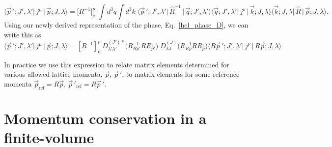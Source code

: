 \documentclass[twocolumn,amsmath,amssymb,prd,10pt,floatfix, 
superscriptaddress,nofootinbib, showpacs, preprintnumbers]{revtex4-1}
\begin{document}
\begin{widetext}
	\begin{equation}
		\big\langle \vec{p}\,'; J' ,\lambda'  \big| \, j^\mu\,  \big| \, \vec{p}; J, \lambda  \big\rangle = 
		\big[ R^{-1} \big]^\mu_\nu\; \int\!\!  d^3 q \int\!\!  d^3 k  \; 		
		\big\langle \vec{p}\,'; J',\lambda' \big| \, \hat{R}^{-1} \, \big|\, \vec{q}; J', \lambda' \big\rangle	 
		\big\langle \vec{q}; J', \lambda'   \big| \, j^\nu \,        \big|\, \vec{k}; J, \lambda   \big\rangle 
		\big\langle \vec{k}; J, \lambda     \big| \, \hat{R}\,       \big|\, \vec{p}; J, \lambda   \big\rangle.
	\end{equation}
Using our newly derived representation of the phase, Eq.~\ref{hel_phase_D}, we can write this as
\begin{equation*}
\big\langle \vec{p}\,'; J', \lambda'  \big| \, j^\mu \, \big| \, \vec{p}; J,\lambda \big\rangle = \left[R^{-1}\right]^\mu_\nu\, 
D^{(J')*}_{\lambda' \lambda'}\big( R^{-1}_{R\hat{p}'} R R_{\hat{p}'} \big)\;  
D^{(J)}_{\lambda \lambda}    \big( R^{-1}_{R\hat{p}} R R_{\hat{p}}   \big) \big\langle  R\vec{p}\,'; J', \lambda' \big|\, j^\nu \, \big|\,  R\vec{p}; J, \lambda \big\rangle 
\end{equation*}

In practice we use this expression to relate matrix elements determined for various allowed lattice momenta, $\vec{p}, \, \vec{p}\,'$, to matrix elements for some reference momenta $\vec{p}_\mathrm{ref} = R\vec{p},\,  \vec{p}\,'_{\!\mathrm{ref}} = R \vec{p}\,'$.




\pagebreak
\section{Momentum conservation in a finite-volume\label{app::two-point}}



\end{widetext}
\end{document}
